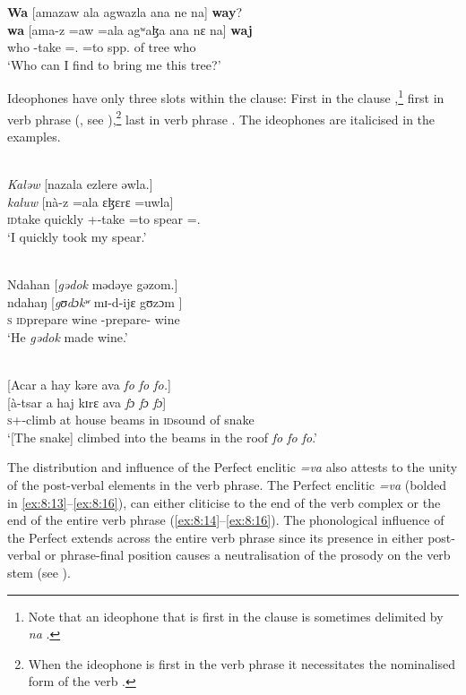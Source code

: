 \ea \label{ex:8:9}
\textbf{Wa}  [amazaw  ala  agwazla  ana  ne  na]  \textbf{way}?\\
\gll  \textbf{wa}      [ama-z  =aw  =ala       agʷaɮa     ana     nɛ    na]     \textbf{waj}\\
      who   {\DEP}-take ={\oneS}.{\IO}  =to   {spp. of tree}     {\DAT}    {\oneS}    {\PSP}    who\\
\glt  ‘Who can I find to bring me this tree?’
\z

Ideophones have only three slots within the clause: First in the clause ,\footnote{Note that an ideophone that is first in the clause is sometimes delimited by \textit{na} .} first in verb phrase (, see ),\footnote{When the ideophone is first in the verb phrase it necessitates the nominalised form of the verb .} last in verb phrase . The ideophones are italicised in the examples.

\ea \label{ex:8:10}\\
\textit{Kal}\textit{ə}\textit{w}  [nazala   ezlere  əwla.]\\
\gll  \textit{kaluw}       [nà-z          =ala    ɛɮɛrɛ    =uwla]\\
      {\textsc{id}take quickly}    {\oneS}+{\PFV}-take  =to   spear    ={\oneS}.{\POSS}\\
\glt  ‘I quickly took my spear.’
\z

\clearpage
\ea \label{ex:8:11}\\
Ndahan  [\textit{gədok}   mədəye  gəzom.]\\
\gll  ndahaŋ  [\textit{gʊdɔkʷ}     mɪ-d-ijɛ       gʊzɔm ]\\
      \textsc{s}        {\textsc{id}prepare wine}  {\NOM}{}-prepare-{\CL}   wine\\
\glt  ‘He \textit{gədok} made wine.’
\z

\ea \label{ex:8:12}\\
{}[Acar  a  hay  kəre  ava  \textit{fo fo fo.}]\\
\gll  {}[à-tsar              a  haj        kɪrɛ       ava  \textit{fɔ fɔ fɔ}]\\
      \textsc{s}+{\PFV}-climb  at   house  beams  in          \textsc{id}sound of snake\\
\glt  ‘[The snake] climbed into the beams in the roof \textit{fo fo fo}.’
\z

The distribution and influence of the Perfect enclitic \textit{=va}  also attests to the unity of the post-verbal elements in the verb phrase. The Perfect enclitic \textit{=va}  (bolded in \ref{ex:8:13}--\ref{ex:8:16}), can either cliticise to the end of the verb complex  or the end of the entire verb phrase (\ref{ex:8:14}--\ref{ex:8:16}). The phonological influence of the Perfect extends across the entire verb phrase since its presence in either post-verbal or phrase-final position causes a neutralisation of the prosody on the verb stem (see ).

